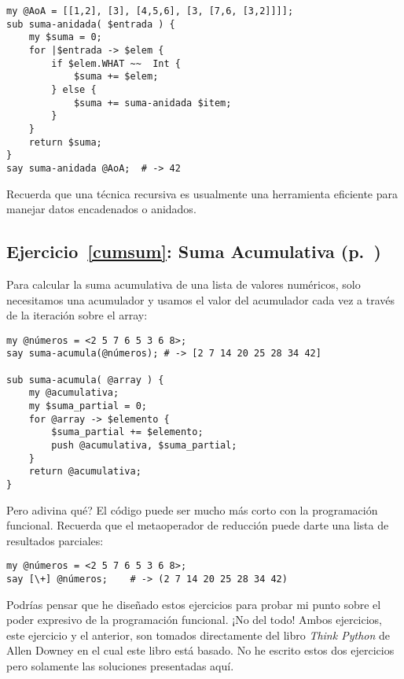 \begin{verbatim}
my @AoA = [[1,2], [3], [4,5,6], [3, [7,6, [3,2]]]];
sub suma-anidada( $entrada ) { 
    my $suma = 0; 
    for |$entrada -> $elem { 
        if $elem.WHAT ~~  Int {
            $suma += $elem;
        } else {
            $suma += suma-anidada $item;
        }
    } 
    return $suma;
}
say suma-anidada @AoA;  # -> 42
\end{verbatim}

Recuerda que una técnica recursiva es usualmente una
herramienta eficiente para manejar datos encadenados o
anidados.

\subsection{Ejercicio~\ref{cumsum}: Suma Acumulativa (p.~\pageref{cumsum})}
\label{sol_cumsum}

Para calcular la suma acumulativa de una lista de valores numéricos,
solo necesitamos una acumulador y usamos el valor del acumulador
cada vez a través de la iteración sobre el array:

\begin{verbatim}
my @números = <2 5 7 6 5 3 6 8>;
say suma-acumula(@números); # -> [2 7 14 20 25 28 34 42]

sub suma-acumula( @array ) {
    my @acumulativa;
    my $suma_partial = 0;
    for @array -> $elemento {
        $suma_partial += $elemento;
        push @acumulativa, $suma_partial;
    }
    return @acumulativa;
}
\end{verbatim}

Pero adivina qué? El código puede ser mucho más corto
con la programación funcional. Recuerda que el metaoperador
de reducción puede darte una lista de resultados parciales:

\begin{verbatim}
my @números = <2 5 7 6 5 3 6 8>;
say [\+] @números;    # -> (2 7 14 20 25 28 34 42)
\end{verbatim}

Podrías pensar que he diseñado estos ejercicios para probar
mi punto sobre el poder expresivo de la programación
funcional. ¡No del todo! Ambos ejercicios, este ejercicio
y el anterior, son tomados directamente del libro \emph{Think Python}
de Allen Downey en el cual este libro está basado. 
No he escrito estos dos ejercicios pero solamente las
soluciones presentadas aquí.


